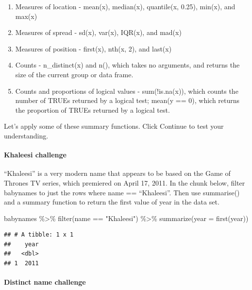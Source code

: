 \documentclass[
]{article}
\newenvironment{Shaded}{\begin{snugshade}}{\end{snugshade}}
\newcommand{\AttributeTok}[1]{\textcolor[rgb]{0.77,0.63,0.00}{#1}}
\newcommand{\FunctionTok}[1]{\textcolor[rgb]{0.00,0.00,0.00}{#1}}
\newcommand{\NormalTok}[1]{#1}
\newcommand{\SpecialCharTok}[1]{\textcolor[rgb]{0.00,0.00,0.00}{#1}}
\newcommand{\StringTok}[1]{\textcolor[rgb]{0.31,0.60,0.02}{#1}}
\providecommand{\tightlist}{%
  \setlength{\itemsep}{0pt}\setlength{\parskip}{0pt}}
\begin{document}
\begin{enumerate}
\def\labelenumi{\arabic{enumi}.}
\tightlist
\item
  Measures of location - mean(x), median(x), quantile(x, 0.25), min(x),
  and max(x)
\item
  Measures of spread - sd(x), var(x), IQR(x), and mad(x)
\item
  Measures of position - first(x), nth(x, 2), and last(x)
\item
  Counts - n\_distinct(x) and n(), which takes no arguments, and returns
  the size of the current group or data frame.
\item
  Counts and proportions of logical values - sum(!is.na(x)), which
  counts the number of TRUEs returned by a logical test; mean(y == 0),
  which returns the proportion of TRUEs returned by a logical test.
\end{enumerate}

Let's apply some of these summary functions. Click Continue to test your
understanding.

\hypertarget{khaleesi-challenge}{%
\paragraph{Khaleesi challenge}\label{khaleesi-challenge}}

``Khaleesi'' is a very modern name that appears to be based on the Game
of Thrones TV series, which premiered on April 17, 2011. In the chunk
below, filter babynames to just the rows where name == ``Khaleesi''.
Then use summarise() and a summary function to return the first value of
year in the data set.

\begin{Shaded}
\begin{Highlighting}[]
\NormalTok{babynames }\SpecialCharTok{\%\textgreater{}\%}
   \FunctionTok{filter}\NormalTok{(name }\SpecialCharTok{==} \StringTok{"Khaleesi"}\NormalTok{) }\SpecialCharTok{\%\textgreater{}\%}
   \FunctionTok{summarize}\NormalTok{(}\AttributeTok{year =} \FunctionTok{first}\NormalTok{(year))}
\end{Highlighting}
\end{Shaded}

\begin{verbatim}
## # A tibble: 1 x 1
##    year
##   <dbl>
## 1  2011
\end{verbatim}

\hypertarget{distinct-name-challenge}{%
\paragraph{Distinct name challenge}\label{distinct-name-challenge}}
\end{document}
